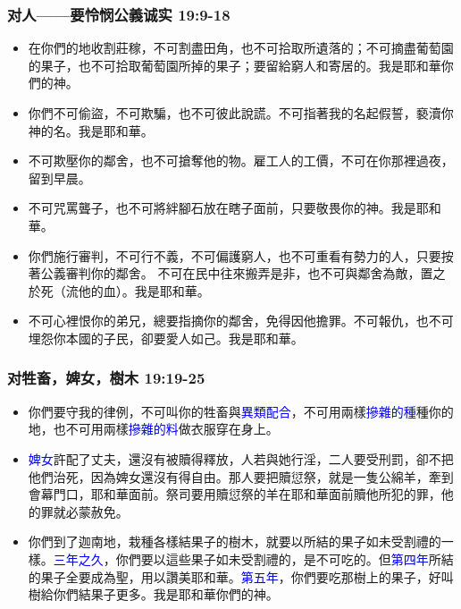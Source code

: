 \subsubsection{对人——要怜悯公義诚实 19:9-18}
\begin{itemize} 
\itemsep-.35em
\item 在你們的地收割莊稼，不可割盡田角，也不可拾取所遺落的；不可摘盡葡萄園的果子，也不可拾取葡萄園所掉的果子；要留給窮人和寄居的。我是耶和華你們的神。
\item 你們不可偷盜，不可欺騙，也不可彼此說謊。不可指著我的名起假誓，褻瀆你神的名。我是耶和華。
\item 不可欺壓你的鄰舍，也不可搶奪他的物。雇工人的工價，不可在你那裡過夜，留到早晨。
\item 不可咒罵聾子，也不可將絆腳石放在瞎子面前，只要敬畏你的神。我是耶和華。
\item 你們施行審判，不可行不義，不可偏護窮人，也不可重看有勢力的人，只要按著公義審判你的鄰舍。 不可在民中往來搬弄是非，也不可與鄰舍為敵，置之於死（流他的血）。我是耶和華。
\item 不可心裡恨你的弟兄，總要指摘你的鄰舍，免得因他擔罪。不可報仇，也不可埋怨你本國的子民，卻要愛人如己。我是耶和華。
\end{itemize}

\subsubsection{对牲畜，婢女，樹木 19:19-25}
\begin{itemize} 
\itemsep-.35em
\item 你們要守我的律例，不可叫你的牲畜與\textcolor{blue}{異類配合}，不可用兩樣\textcolor{blue}{摻雜的種}種你的地，也不可用兩樣\textcolor{blue}{摻雜的料}做衣服穿在身上。
\item \textcolor{blue}{婢女}許配了丈夫，還沒有被贖得釋放，人若與她行淫，二人要受刑罰，卻不把他們治死，因為婢女還沒有得自由。那人要把贖愆祭，就是一隻公綿羊，牽到會幕門口，耶和華面前。祭司要用贖愆祭的羊在耶和華面前贖他所犯的罪，他的罪就必蒙赦免。
\item 你們到了迦南地，栽種各樣結果子的樹木，就要以所結的果子如未受割禮的一樣。\textcolor{blue}{三年之久}，你們要以這些果子如未受割禮的，是不可吃的。但\textcolor{blue}{第四年}所結的果子全要成為聖，用以讚美耶和華。\textcolor{blue}{第五年}，你們要吃那樹上的果子，好叫樹給你們結果子更多。我是耶和華你們的神。
\end{itemize}

